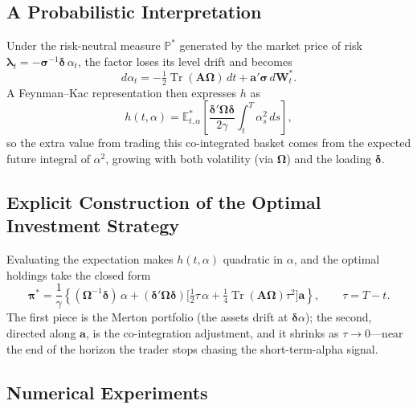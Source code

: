 \documentclass[11pt]{article}
\newcommand{\E}{\mathbb{E}}
\newcommand{\Prob}{\mathbb{P}}
\newcommand{\dd}{\,d}
\DeclareMathOperator{\Tr}{Tr}
\begin{document}
\subsection{A Probabilistic Interpretation}

Under the risk-neutral measure $\Prob^*$ generated by the market price of risk
$\bm\lambda_t = -\bm\sigma^{-1}\bm\delta\,\alpha_t$, the factor loses its level drift and becomes
\begin{equation}\label{eq:1113}
  d\alpha_t = -\tfrac12\Tr(\bm A\bm\Omega)\dd t + \bm a'\bm\sigma\dd\bm W^*_t. \tag{11.13}
\end{equation}
A Feynman--Kac representation then expresses $h$ as
\begin{equation}\label{eq:1114}
  h(t,\alpha) = \E^*_{t,\alpha}\!\left[\frac{\bm\delta'\bm\Omega\bm\delta}{2\gamma}\int_t^T \alpha_s^2\dd s\right], \tag{11.14}
\end{equation}
so the extra value from trading this co-integrated basket comes from the expected future integral of
$\alpha^2$, growing with both volatility (via $\bm\Omega$) and the loading $\bm\delta$.

\subsection{Explicit Construction of the Optimal Investment Strategy}

Evaluating the expectation makes $h(t,\alpha)$ quadratic in $\alpha$, and the optimal holdings take the
closed form
\begin{equation}\label{eq:1116}
  \bm\pi^* = \frac1\gamma\left\{(\bm\Omega^{-1}\bm\delta)\,\alpha
    + (\bm\delta'\bm\Omega\bm\delta)\Big[\tfrac12\tau\,\alpha + \tfrac14\Tr(\bm A\bm\Omega)\tau^2\Big]\bm a\right\},
  \qquad \tau = T-t. \tag{11.16}
\end{equation}
The first piece is the Merton portfolio (the assets drift at $\bm\delta\alpha$); the second, directed
along $\bm a$, is the co-integration adjustment, and it shrinks as $\tau\to 0$---near the end of the
horizon the trader stops chasing the short-term-alpha signal.

\subsection{Numerical Experiments}
\end{document}
